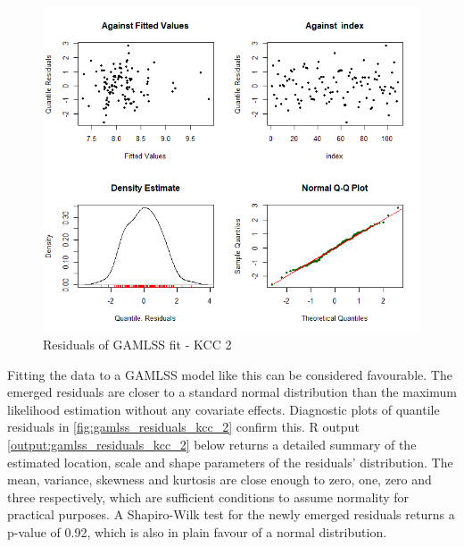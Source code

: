 \begin{figure}[H]
\centering
  \includegraphics[width=0.95\linewidth]{figures/gamlss_residuals_kcc_2.png}
  \caption{Residuals of GAMLSS fit - KCC 2}
  \label{fig:gamlss_residuals_kcc_2}
\end{figure}



Fitting the data to a \ac{GAMLSS} model like this can be considered favourable. The emerged residuals are closer to a standard normal distribution than the maximum likelihood estimation without any covariate effects. Diagnostic plots of quantile residuals in \autoref{fig:gamlss_residuals_kcc_2} confirm this. R output \ref{output:gamlss_residuals_kcc_2} below returns a detailed summary of the estimated location, scale and shape parameters of the residuals' distribution. The mean, variance, skewness and kurtosis are close enough to zero, one, zero and three respectively, which are sufficient conditions to assume normality for practical purposes. A Shapiro-Wilk test for the newly emerged residuals returns a p-value of 0.92, which is also in plain favour of a normal distribution.
\\









